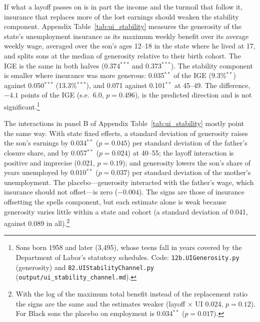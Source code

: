 If what a layoff passes on is in part the income and the turmoil that follow it, insurance that replaces more of the
lost earnings should weaken the stability component. Appendix Table~\ref{tab:ui_stability} measures the generosity of the
state's unemployment insurance as its maximum weekly benefit over its average weekly wage, averaged over the son's ages
12--18 in the state where he lived at 17, and splits sons at the median of generosity relative to their birth cohort.
The IGE is the same in both halves (0.374$^{***}$ and 0.373$^{***}$). The stability component is smaller where
insurance was more generous: 0.035$^{**}$ of the IGE (9.3\%$^{**}$) against 0.050$^{***}$ (13.3\%$^{***}$), and 0.071
against 0.101$^{**}$ at 45--49. The difference, $-4.1$ points of the IGE (s.e.\ 6.0, $p = 0.496$), is the predicted
direction and is not significant.\footnote{Sons born 1958 and later (3,495), whose teens fall in years covered by the
Department of Labor's statutory schedules. Code: \texttt{12b.UIGenerosity.py} (generosity) and
\texttt{82.UIStabilityChannel.py} (\texttt{output/ui\_stability\_channel.md}).}


The interactions in panel B of Appendix Table~\ref{tab:ui_stability} mostly point the same way. With state fixed effects, a standard deviation of generosity raises the
son's earnings by 0.034$^{**}$ ($p = 0.045$) per standard deviation of the father's closure share, and by 0.057$^{**}$
($p = 0.024$) at 40--55; the layoff interaction is positive and imprecise (0.021, $p = 0.19$); and generosity lowers the
son's share of years unemployed by 0.010$^{**}$ ($p = 0.037$) per standard deviation of the mother's unemployment. The
placebo---generosity interacted with the father's wage, which insurance should not offset---is zero ($-0.004$). The
signs are those of insurance offsetting the spells component, but each estimate alone is weak because generosity varies little
within a state and cohort (a standard deviation of 0.041, against 0.089 in all).\footnote{With the log of the maximum
total benefit instead of the replacement ratio the signs are the same and the estimates weaker (layoff $\times$ UI
0.024, $p = 0.12$). For Black sons the placebo on employment is 0.034$^{**}$ ($p = 0.017$).} 

